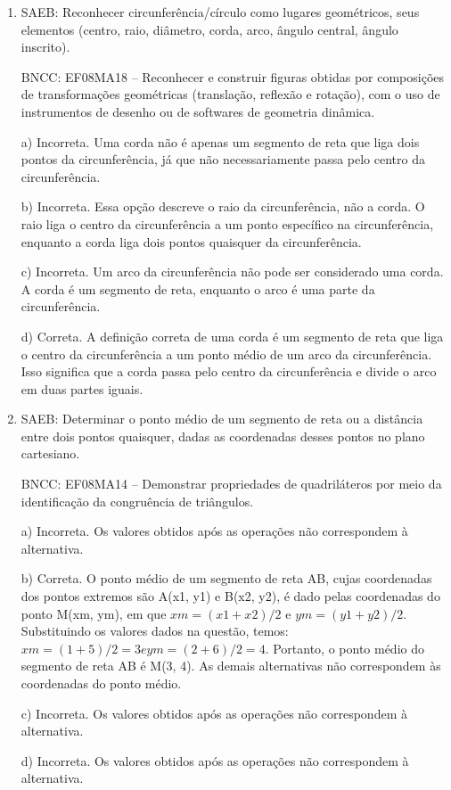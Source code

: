 \begin{enumerate}
\item SAEB: Reconhecer circunferência/círculo como lugares geométricos, seus
elementos (centro, raio, diâmetro, corda, arco, ângulo central, ângulo
inscrito).

BNCC: EF08MA18 -- Reconhecer e construir figuras obtidas por composições
de transformações geométricas (translação, reflexão e rotação), com o
uso de instrumentos de desenho ou de softwares de geometria dinâmica.

a) Incorreta. Uma corda não é apenas um segmento de reta que liga
dois pontos da circunferência, já que não necessariamente passa pelo
centro da circunferência.

b) Incorreta. Essa opção descreve o raio da circunferência, não a
corda. O raio liga o centro da circunferência a um ponto específico na
circunferência, enquanto a corda liga dois pontos quaisquer da
circunferência.

c) Incorreta. Um arco da circunferência não pode ser considerado
uma corda. A corda é um segmento de reta, enquanto o arco é uma parte da
circunferência.

d) Correta. A definição correta de uma corda é um segmento de reta
que liga o centro da circunferência a um ponto médio de um arco da
circunferência. Isso significa que a corda passa pelo centro da
circunferência e divide o arco em duas partes iguais.

\item SAEB: Determinar o ponto médio de um segmento de reta ou a distância
entre dois pontos quaisquer, dadas as coordenadas desses pontos no plano
cartesiano.

BNCC: EF08MA14 -- Demonstrar propriedades de quadriláteros por meio da
identificação da congruência de triângulos.

a) Incorreta. Os valores obtidos após as operações não correspondem
à alternativa.

b) Correta. O ponto médio de um segmento de reta AB, cujas
coordenadas dos pontos extremos são A(x1, y1) e B(x2, y2), é dado pelas
coordenadas do ponto M(xm, ym), em que $xm = (x1 + x2)/2$ e $ym = (y1 +
y2)/2$. Substituindo os valores dados na questão, temos: $xm = (1 + 5)/2 =
3 e ym = (2 + 6)/2 = 4$. Portanto, o ponto médio do segmento de reta AB é
M(3, 4). As demais alternativas não correspondem às coordenadas do ponto
médio.

c) Incorreta. Os valores obtidos após as operações não correspondem
à alternativa.

d) Incorreta. Os valores obtidos após as operações não correspondem
à alternativa.


\end{enumerate}
